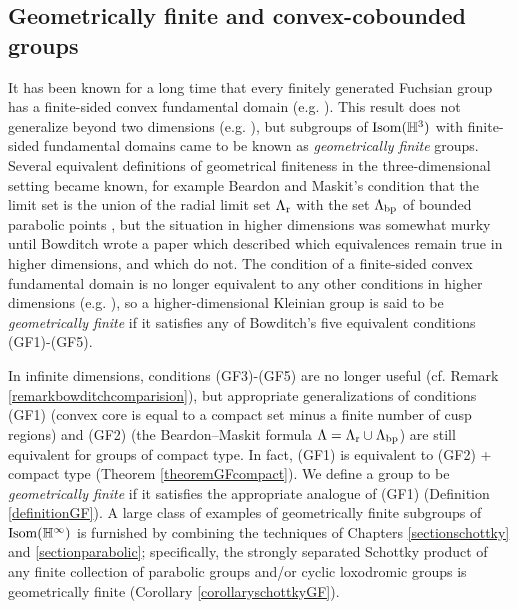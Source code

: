 \subsection{Geometrically finite and convex-cobounded groups}

It has been known for a long time that every finitely generated Fuchsian group has a finite-sided convex fundamental domain (e.g. \cite[Theorem 4.6.1]{Katok_book}). This result does not generalize beyond two dimensions (e.g. \cite{Bers, Jorgensen}), but subgroups of $\Isom(\H^3)$ with finite-sided fundamental domains came to be known as \emph{geometrically finite} groups. Several equivalent definitions of geometrical finiteness in the three-dimensional setting became known, for example Beardon and Maskit's condition that the limit set is the union of the radial limit set $\Lambda_{\mathrm r}$ with the set $\Lambda_{\mathrm{bp}}$ of bounded parabolic points \cite{BeardonMaskit}, but the situation in higher dimensions was somewhat murky until Bowditch \cite{Bowditch_geometrical_finiteness} wrote a paper which described which equivalences remain true in higher dimensions, and which do not. The condition of a finite-sided convex fundamental domain is no longer equivalent to any other conditions in higher dimensions (e.g. \cite{Apanasov}), so a higher-dimensional Kleinian group is said to be \emph{geometrically finite} if it satisfies any of Bowditch's five equivalent conditions (GF1)-(GF5).

In infinite dimensions, conditions (GF3)-(GF5) are no longer useful (cf. Remark \ref{remarkbowditchcomparision}), but appropriate generalizations of conditions (GF1) (convex core is equal to a compact set minus a finite number of cusp regions) and (GF2) (the Beardon--Maskit formula $\Lambda = \Lambda_{\mathrm r}\cup\Lambda_{\mathrm{bp}}$) are still equivalent for groups of compact type. In fact, (GF1) is equivalent to (GF2) + compact type (Theorem \ref{theoremGFcompact}). We define a group to be \emph{geometrically finite} if it satisfies the appropriate analogue of (GF1) (Definition \ref{definitionGF}). A large class of examples of geometrically finite subgroups of $\Isom(\H^\infty)$ is furnished by combining the techniques of Chapters \ref{sectionschottky} and \ref{sectionparabolic}; specifically, the strongly separated Schottky product of any finite collection of parabolic groups and/or cyclic loxodromic groups is geometrically finite (Corollary \ref{corollaryschottkyGF}).


